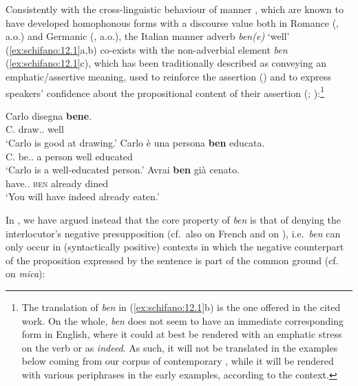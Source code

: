 \documentclass[output=paper]{langsci/langscibook}
\begin{document}
Consistently with the cross-linguistic behaviour of manner , which are
known to have developed  homophonous forms with a discourse value both in
Romance (\citealt{Belletti1990,Belletti1994,Lonzi1991,Cinque1976,Cinque1999,%
Vinet1996,WalDet2007,Coniglio2008,Hernanz2010,Cardinaletti2011,PadPen2014},
a.o.) and Germanic (\citealt{Weydt1969,Baardewyk-Resseguier1991}, a.o.), the
Italian manner adverb \emph{ben(e)} ‘well’ (\ref{ex:schifano:12.1}a,b) co-exists with the
non-adverbial element \emph{ben} (\ref{ex:schifano:12.1}c), which has been traditionally described
as conveying an em\-phat\-ic/as\-sertive meaning, used to
reinforce the assertion (\citealt{Belletti1990,Belletti1994,Lonzi1991}) and
to express speakers’ confidence about the propositional content of their
assertion (\citealt{Coniglio2008}; \citealt{Cardinaletti2011}):\footnote{The
    translation of \emph{ben} in (\ref{ex:schifano:12.1}b) is the one offered in the cited work. On
    the whole, \emph{ben} does not seem to have an immediate corresponding form
    in English, where it could at best be rendered with an emphatic stress on
    the verb or as \emph{indeed}. As such, it will not be translated in the
examples below coming from our corpus of contemporary , while it will be
rendered with various periphrases in the early examples, according to the
context.}

\ea\label{ex:schifano:12.1}  \parencite[171, fn.\ 20]{Cinque1999}
	\ea
		\gll    Carlo disegna \textbf{bene}.\\
			    C.  draw.\Prs{}.\Tsg{}  well\\
        \glt    \enquote*{Carlo is good at drawing.}
	\ex
		\gll    Carlo è una persona \textbf{ben} educata.\\
			    C.  be.\Prs.\Tsg{} a person well  educated\\
        \glt    \enquote*{Carlo is a well-educated person.}
    \ex
		\gll    Avrai \textbf{ben} già cenato.\\
			    have.\Fut{}.\Ssg{} \textsc{ben} already dined\\
        \glt    \enquote*{You will have indeed already eaten.}
	\z
\z

In \textcite{CognSchi2018b,CognSchi2018}, we have argued instead that the core
property of  \emph{ben} is that of denying the interlocutor’s negative
presupposition (cf.\ also \citealt{WalDet2007} on French and
\citealt{Hernanz2010} on ), i.e.\ \emph{ben} can only occur in
(syntactically positive) contexts in which the negative counterpart of the
proposition expressed by the sentence is part of the common ground (cf.\
\citealt{Cinque1976} on \emph{mica}):
\end{document}
